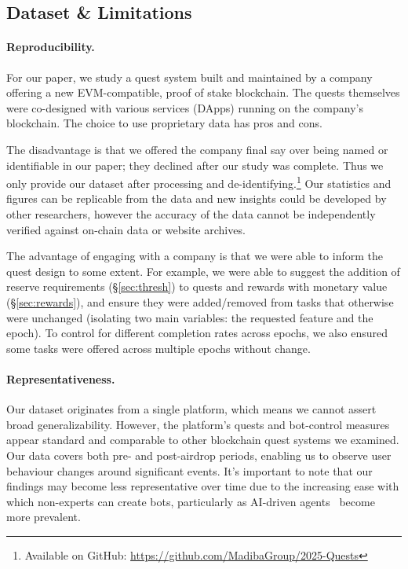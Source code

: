
\subsection{Dataset \& Limitations}

\paragraph{Reproducibility.} For our paper, we study a quest system built and maintained by a company offering a new EVM-compatible, proof of stake blockchain. The quests themselves were co-designed with various services (DApps) running on the company's blockchain. The choice to use proprietary data has pros and cons. 

The disadvantage is that we offered the company final say over being named or identifiable in our paper; they declined after our study was complete. Thus we only provide our dataset after processing and de-identifying.\footnote{Available on GitHub: \url{https://github.com/MadibaGroup/2025-Quests}} Our statistics and figures can be replicable from the data and new insights could be developed by other researchers, however the accuracy of the data cannot be independently verified against on-chain data or website archives.

The advantage of engaging with a company is that we were able to inform the quest design to some extent. For example, we were able to suggest the addition of reserve requirements (§\ref{sec:thresh}) to quests and rewards with monetary value (§\ref{sec:rewards}), and ensure they were added/removed from tasks that otherwise were unchanged (isolating two main variables: the requested feature and the epoch). To control for different completion rates across epochs, we also ensured some tasks were offered across multiple epochs without change.

\paragraph{Representativeness.} Our dataset originates from a single platform, which means we cannot assert broad generalizability. However, the platform's quests and bot-control measures appear standard and comparable to other blockchain quest systems we examined. Our data covers both pre- and post-airdrop periods, enabling us to observe user behaviour changes around significant events. It's important to note that our findings may become less representative over time due to the increasing ease with which non-experts can create bots, particularly as AI-driven agents~\cite{Ante24,WGN+25} become more prevalent.

